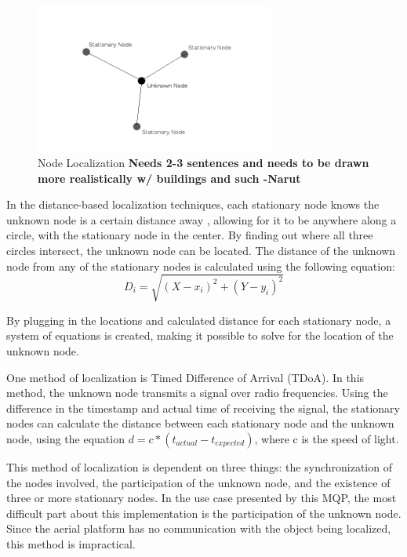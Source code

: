 \begin{figure}[ht]
\centering
\includegraphics[width=0.70\textwidth]{img/node-localization-lines.png}
\caption{Node Localization \textbf{Needs 2-3 sentences and needs to be drawn more realistically w/ buildings and such -Narut}}
\label{fig:node_localization}
\end{figure}\par
In the distance-based localization techniques, each stationary node knows the unknown node is a certain distance away \cite{local_conf}, allowing for it to be anywhere along a circle, with the stationary node in the center. By finding out where all three circles intersect, the unknown node can be located. The distance of the unknown node from any of the stationary nodes is calculated using the following equation:
\[D_i =\sqrt{(X - x_i)^2 + (Y-y_i)^2}\]\par
By plugging in the locations and calculated distance for each stationary node, a system of equations is created, making it possible to solve for the location of the unknown node.\par
One method of localization is Timed Difference of Arrival (TDoA)\cite{local_conf}. In this method, the unknown node transmits a signal over radio frequencies. Using the difference in the timestamp and actual time of receiving the signal, the stationary nodes can calculate the distance between each stationary node and the unknown node, using the equation \( d = c*(t_{actual} - t_{expected}) \), where c is the speed of light. \par
This method of localization is dependent on three things: the synchronization of the nodes involved, the participation of the unknown node, and the existence of three or more stationary nodes. In the use case presented by this MQP, the most difficult part about this implementation is the participation of the unknown node. Since the aerial platform has no communication with the object being localized, this method is impractical. \par

